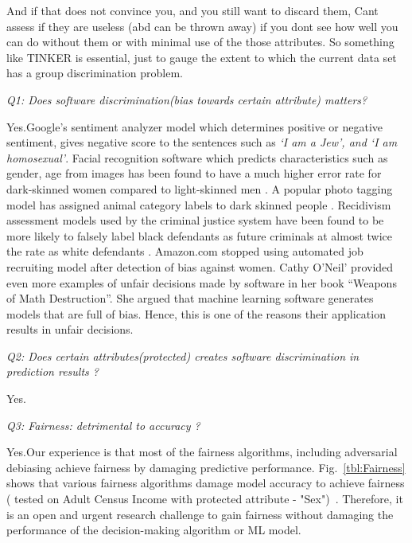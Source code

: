 \documentclass{NSF}
\begin{document}
\begin{nsfdescription}
And if that does not convince you, and you still want to discard them, Cant assess if they are useless (abd can be thrown away) if you dont see how well you can do without them or with minimal use of the those attributes. So something like TINKER is essential, just to gauge the extent to which the current data set has a group discrimination problem.

{\em Q1: Does software discrimination(bias towards certain attribute) matters?}

Yes.Google's sentiment analyzer model which determines positive or negative sentiment, gives negative score to the sentences such as \textit{`I am a Jew', and `I am homosexual'}\cite{Google_Sentiment}. Facial recognition software which predicts characteristics such as gender, age from images has been found to have a much higher error rate for dark-skinned women compared to light-skinned men \cite{Gender_Bias}. A popular photo tagging model has assigned animal category labels to dark skinned people \cite{Google_Photo}. Recidivism assessment models used by the criminal justice system have been found to be more likely to falsely label black defendants as future criminals at almost twice the rate as white defendants \cite{Machine_Bias}. Amazon.com stopped using automated job recruiting model after detection of bias against women\cite{Amazon_Bias}. Cathy O'Neil’ provided even more examples of unfair decisions made by software in her book ``Weapons of Math Destruction''\cite{O'Neil:2016:WMD:3002861}. She argued that machine learning software generates models that are full of bias. Hence, this is one of the reasons their application results in unfair decisions.

{\em Q2: Does certain attributes(protected) creates software  discrimination in prediction results ?}

Yes.

{\em Q3: Fairness: detrimental to accuracy ?}

Yes.Our experience is that most of the fairness algorithms, including
adversarial debiasing   achieve fairness by damaging
predictive performance.  Fig.~\ref{tbl:Fairness} shows that various fairness algorithms damage model accuracy to achieve fairness ( tested on  Adult Census Income with protected attribute - "Sex")~\cite{IBM}.
Therefore, it is an open and urgent research challenge to gain fairness without damaging the performance of the decision-making algorithm or ML model.  


\end{nsfdescription}
\end{document}
